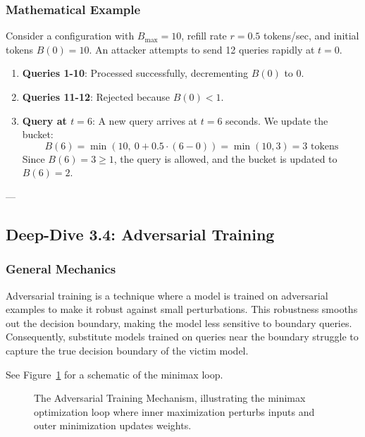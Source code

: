 \documentclass{article}
\begin{document}
\subsubsection{Mathematical Example}
Consider a configuration with $B_{\text{max}} = 10$, refill rate $r = 0.5$ tokens/sec, and initial tokens $B(0) = 10$.
An attacker attempts to send 12 queries rapidly at $t = 0$.
\begin{enumerate}
    \item \textbf{Queries 1-10}: Processed successfully, decrementing $B(0)$ to $0$.
    \item \textbf{Queries 11-12}: Rejected because $B(0) < 1$.
    \item \textbf{Query at $t=6$}: A new query arrives at $t = 6$ seconds. We update the bucket:
    $$B(6) = \min(10, \ 0 + 0.5 \cdot (6 - 0)) = \min(10, 3) = 3 \text{ tokens}$$
    Since $B(6) = 3 \ge 1$, the query is allowed, and the bucket is updated to $B(6) = 2$.
\end{enumerate}

---

\subsection{Deep-Dive 3.4: Adversarial Training}

\subsubsection{General Mechanics}
Adversarial training is a technique where a model is trained on adversarial examples to make it robust against small perturbations. This robustness smooths out the decision boundary, making the model less sensitive to boundary queries. Consequently, substitute models trained on queries near the boundary struggle to capture the true decision boundary of the victim model.

See Figure~\ref{fig:adversarial_training} for a schematic of the minimax loop.

\begin{figure}[htbp]
    \centering
    \caption{The Adversarial Training Mechanism, illustrating the minimax optimization loop where inner maximization perturbs inputs and outer minimization updates weights.}
    \label{fig:adversarial_training}
\end{figure}
\end{document}
